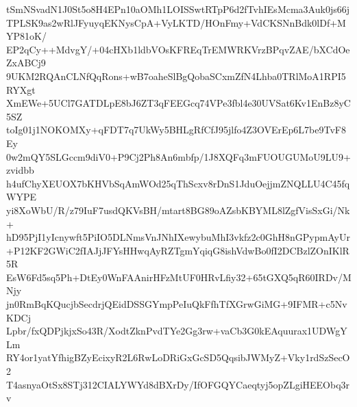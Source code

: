 tSmNSvadN1J0St5o8H4EPn10aOMh1LOISSwtRTpP6d2fTvhIEsMcma3Auk0js66j
TPLSK9as2wRlJFyuyqEKNysCpA+VyLKTD/HOnFmy+VdCKSNnBdk0lDf+MYP81oK/
EP2qCy++MdvgY/+04cHXb1ldbVOsKFREqTrEMWRKVrzBPqvZAE/bXCdOeZxABCj9
9UKM2RQAnCLNfQqRons+wB7oaheSlBgQobaSCxmZfN4Lhba0TRlMoA1RPI5RYXgt
XmEWe+5UCl7GATDLpE8bJ6ZT3qFEEGcq74VPe3fbl4e30UVSat6Kv1EnBz8yC5SZ
toIg01j1NOKOMXy+qFDT7q7UkWy5BHLgRfCfJ95jlfo4Z3OVErEp6L7be9TvF8Ey
0w2mQY5SLGccm9diV0+P9Cj2Ph8An6mbfp/1J8XQFq3mFUOUGUMoU9LU9+zvidbb
h4ufChyXEUOX7bKHVbSqAmWOd25qThScxv8rDnS1JduOejjmZNQLLU4C45fqWYPE
yi8XoWbU/R/z79IuF7usdQKVsBH/mtart8BG89oAZsbKBYML8lZgfVisSxGi/Nk+
hD95PjI1yIcnywft5PiIO5DLNmsVnJNhIXewybuMhI3vkfz2c0GhH8nGPypmAyUr
+P12KF2GWiC2fIAJjJFYsHHwqAyRZTgmYqiqG8ishVdwBo0fI2DCBzlZOnIKlR5R
EsW6Fd5sq5Ph+DtEy0WnFAAnirHFzMtUF0HRvLfiy32+65tGXQ5qR60IRDv/MNjy
jn0RmBqKQucjbSecdrjQEidDSSGYmpPeIuQkFfhTfXGrwGiMG+9IFMR+c5NvKDCj
Lpbr/fxQDPjkjxSo43R/XodtZknPvdTYe2Gg3rw+vaCb3G0kEAquurax1UDWgYLm
RY4or1yatYfhigBZyEcixyR2L6RwLoDRiGxGcSD5QqsibJWMyZ+Vky1rdSzSecO2
T4asnyaOtSx8STj312CIALYWYd8dBXrDy/IfOFGQYCaeqtyj5opZLgiHEEObq3rv
